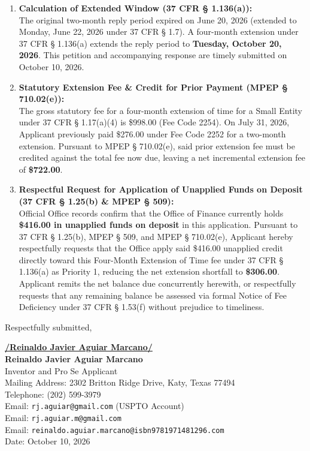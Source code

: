 \documentclass[11pt,letterpaper]{article}
\begin{document}
\begin{enumerate}[leftmargin=*]
    \item \textbf{Calculation of Extended Window (37 CFR \S{} 1.136(a)):} \\
    The original two-month reply period expired on June 20, 2026 (extended to Monday, June 22, 2026 under 37 CFR \S{} 1.7). A four-month extension under 37 CFR \S{} 1.136(a) extends the reply period to \textbf{Tuesday, October 20, 2026}. This petition and accompanying response are timely submitted on October 10, 2026.

    \item \textbf{Statutory Extension Fee \& Credit for Prior Payment (MPEP \S{} 710.02(e)):} \\
    The gross statutory fee for a four-month extension of time for a Small Entity under 37 CFR \S{} 1.17(a)(4) is \$998.00 (Fee Code 2254). On July 31, 2026, Applicant previously paid \$276.00 under Fee Code 2252 for a two-month extension. Pursuant to MPEP \S{} 710.02(e), said prior extension fee must be credited against the total fee now due, leaving a net incremental extension fee of \textbf{\$722.00}.

    \item \textbf{Respectful Request for Application of Unapplied Funds on Deposit (37 CFR \S{} 1.25(b) \& MPEP \S{} 509):} \\
    Official Office records confirm that the Office of Finance currently holds \textbf{\$416.00 in unapplied funds on deposit} in this application. Pursuant to 37 CFR \S{} 1.25(b), MPEP \S{} 509, and MPEP \S{} 710.02(e), Applicant hereby respectfully requests that the Office apply said \$416.00 unapplied credit directly toward this Four-Month Extension of Time fee under 37 CFR \S{} 1.136(a) as Priority 1, reducing the net extension shortfall to \textbf{\$306.00}. Applicant remits the net balance due concurrently herewith, or respectfully requests that any remaining balance be assessed via formal Notice of Fee Deficiency under 37 CFR \S{} 1.53(f) without prejudice to timeliness.
\end{enumerate}

\vspace{0.6cm}
\begin{singlespace}
\noindent Respectfully submitted, \par\vspace{0.8cm}
\underline{\textbf{/Reinaldo Javier Aguiar Marcano/}} \\
\textbf{Reinaldo Javier Aguiar Marcano} \\
Inventor and Pro Se Applicant \\
Mailing Address: 2302 Britton Ridge Drive, Katy, Texas 77494 \\
Telephone: (202) 599-3979 \\
Email: \texttt{rj.aguiar@gmail.com} (USPTO Account) \\
Email: \texttt{rj.aguiar.m@gmail.com} \\
Email: \texttt{reinaldo.aguiar.marcano@isbn9781971481296.com} \\
Date: October 10, 2026
\end{singlespace}
\end{document}
